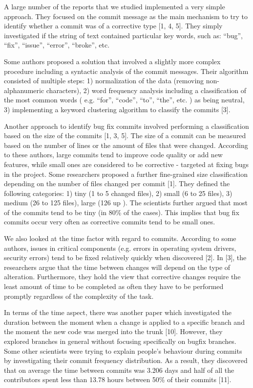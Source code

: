 A large number of the reports that we studied implemented a very simple approach. They focused on the commit message as the main mechanism to try to identify whether a commit was of a corrective type [1, 4, 5]. They simply investigated if the string of text contained particular key words, such as: “bug”, “fix”, “issue”, “error”, “broke”, etc.\par

Some authors proposed a solution that involved a slightly more complex procedure including a syntactic analysis of the commit messages. Their algorithm consisted of multiple steps: 1) normalization of the data (removing non-alphanumeric characters), 2) word frequency analysis including a classification of the most common words ( e.g. “for”, “code”, “to”, “the”, etc. ) as being neutral, 3) implementing a keyword clustering algorithm to classify the commits [3].\par

Another approach to identify bug fix commits involved performing a classification based on the size of the commits [1, 3, 5]. The size of a commit can be measured based on the number of lines or the amount of files that were changed. According to these authors, large commits tend to improve code quality or add new features, while small ones are considered to be corrective - targeted at fixing bugs in the project. Some researchers proposed a further fine-grained size classification depending on the number of files changed per commit [1]. They defined the following categories: 1) tiny (1 to 5 changed files), 2) small (6 to 25 files), 3) medium (26 to 125 files), large (126 up ). The scientists further argued that most of the commits tend to be tiny (in 80\% of the cases). This implies that bug fix commits occur very often as corrective commits tend to be small ones.\par

We also looked at the time factor with regard to commits. According to some authors, issues in critical components (e.g. errors in operating system drivers, security errors) tend to be fixed relatively quickly when discovered [2]. In [3], the researchers argue that the time between changes will depend on the type of alteration. Furthermore, they hold the view that corrective changes require the least amount of time to be completed as often they have to be performed promptly regardless of the complexity of the task.\par

In terms of the time aspect, there was another paper which investigated the duration between the moment when a change is applied to a specific branch and the moment the new code was merged into the trunk [10]. However, they explored branches in general without focusing specifically on bugfix branches. Some other scientists were trying to explain people’s behaviour during commits by investigating their commit frequency distribution. As a result, they discovered that on average the time between commits was 3.206 days and half of all the contributors spent less than 13.78 hours between 50\% of their commits [11].\par

